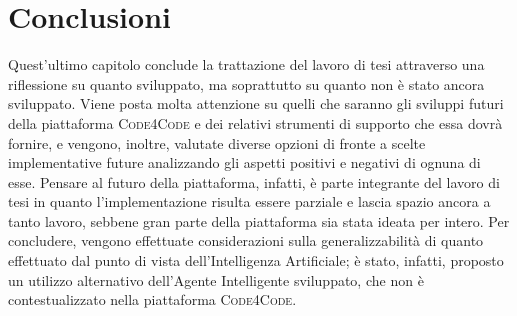 \chapter{Conclusioni} %
%


\begin{citazione}
Quest'ultimo capitolo conclude la trattazione del lavoro di tesi attraverso una riflessione su quanto sviluppato, ma soprattutto su quanto non è stato ancora sviluppato. Viene posta molta attenzione su quelli che saranno gli sviluppi futuri della piattaforma \textsc{Code4Code} e dei relativi strumenti di supporto che essa dovrà fornire, e vengono, inoltre, valutate diverse opzioni di fronte a scelte implementative future analizzando gli aspetti positivi e negativi di ognuna di esse. Pensare al futuro della piattaforma, infatti, è parte integrante del lavoro di tesi in quanto l'implementazione risulta essere parziale e lascia spazio ancora a tanto lavoro, sebbene gran parte della piattaforma sia stata ideata per intero. Per concludere, vengono effettuate considerazioni sulla generalizzabilità di quanto effettuato dal punto di vista dell'Intelligenza Artificiale; è stato, infatti, proposto un utilizzo alternativo dell'Agente Intelligente sviluppato, che non è contestualizzato nella piattaforma \textsc{Code4Code}.
\end{citazione}
\newpage

